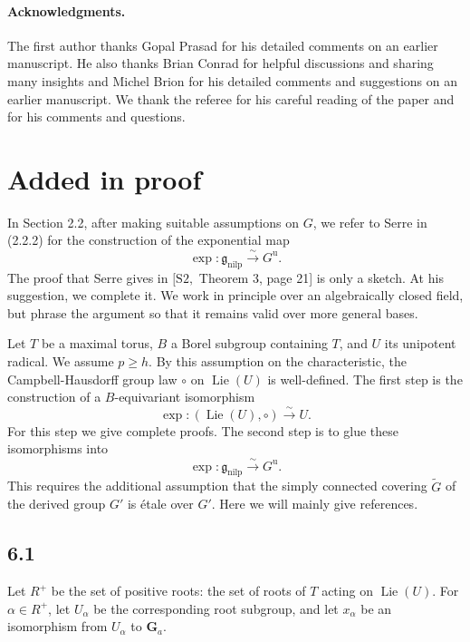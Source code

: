 \documentclass[11pt]{article}
\newcommand{\Ga}{\mathbf G_a}
\newcommand{\Lie}{\operatorname{Lie}}
\newcommand{\nilp}{\mathrm{nilp}}
\newcommand{\unip}{\mathrm u}
\begin{document}
\paragraph{Acknowledgments.}
The first author thanks Gopal Prasad for his detailed comments on an earlier manuscript.
He also thanks Brian Conrad for helpful discussions and sharing many insights and Michel
Brion for his detailed comments and suggestions on an earlier manuscript. We thank the
referee for his careful reading of the paper and for his comments and questions.

\section{Added in proof}

In Section 2.2, after making suitable assumptions on \(G\), we refer to Serre in (2.2.2)
for the construction of the exponential map
\[
  \exp:\mathfrak g_{\nilp}\xrightarrow{\sim}G^{\unip}.
\]
The proof that Serre gives in \([\mathrm{S2},\) Theorem 3, page 21] is only a sketch. At
his suggestion, we complete it. We work in principle over an algebraically closed field, but
phrase the argument so that it remains valid over more general bases.

Let \(T\) be a maximal torus, \(B\) a Borel subgroup containing \(T\), and \(U\) its
unipotent radical. We assume \(p\ge h\). By this assumption on the characteristic, the
Campbell-Hausdorff group law \(\circ\) on \(\Lie(U)\) is well-defined. The first step is the
construction of a \(B\)-equivariant isomorphism
\begin{equation}
  \exp:(\Lie(U),\circ)\xrightarrow{\sim}U.
  \tag{6.0.1}
\end{equation}
For this step we give complete proofs. The second step is to glue these isomorphisms into
\begin{equation}
  \exp:\mathfrak g_{\nilp}\xrightarrow{\sim}G^{\unip}.
  \tag{6.0.2}
\end{equation}
This requires the additional assumption that the simply connected covering \(\widetilde G\)
of the derived group \(G'\) is étale over \(G'\). Here we will mainly give references.

\subsection*{6.1}
Let \(R^+\) be the set of positive roots: the set of roots of \(T\) acting on \(\Lie(U)\).
For \(\alpha\in R^+\), let \(U_\alpha\) be the corresponding root subgroup, and let
\(x_\alpha\) be an isomorphism from \(U_\alpha\) to \(\Ga\).
\end{document}
